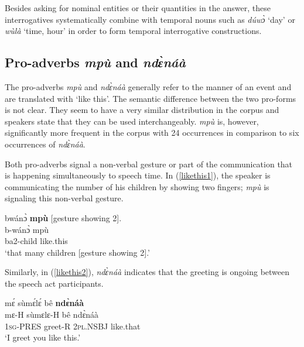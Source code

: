 \noindent Besides asking for nominal entities or their quantities in the answer, these interrogatives systematically combine with temporal nouns such as {\itshape dúwɔ̀} `day' or {\itshape wùlà} `time, hour' in order to form temporal interrogative constructions.










\subsection{Pro-adverbs {\itshape mpù} and {\itshape ndɛ̀náà}}
\label{sec:ProADV}

The pro-adverbs {\itshape mpù} and {\itshape ndɛ̀náà} generally refer to the manner of an event and are translated with `like this'. The semantic difference between the two pro-forms is not clear. They seem to have a very similar distribution in the corpus and speakers state that they can be used interchangeably. {\itshape mpù} is, however, significantly more frequent in the corpus with 24 occurrences in comparison to six occurrences of {\itshape ndɛ̀náà}.

Both pro-adverbs signal a non-verbal gesture or part of the communication that is happening simultaneously to speech time. In (\ref{likethis1}), the speaker is communicating the number of his children by showing two fingers; {\itshape mpù} is signaling this non-verbal gesture.

\begin{exe} 
\ex\label{likethis1} 
  \glll  bwánɔ̀ {\bfseries mpù} [gesture showing 2]. \\
          b-wánɔ̀ mpù \\
         ba2-child like.this   \\
    \trans `that many children [gesture showing 2].'
\end{exe}

\noindent Similarly, in (\ref{likethis2}), {\itshape ndɛ̀náà} indicates that the greeting is ongoing between the speech act participants.

\begin{exe} 
\ex\label{likethis2}
  \glll     mɛ́ sùmɛ́lɛ́ bê {\bfseries ndɛ̀náà} \\
            mɛ-H sùmɛlɛ-H bê ndɛ̀náà \\
              1\textsc{sg}-PRES greet-R 2\textsc{pl}.NSBJ like.that   \\
    \trans `I greet you like this.'
\end{exe}

